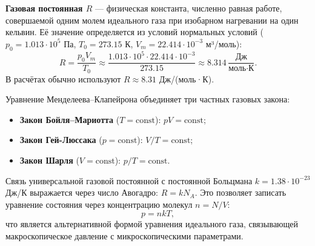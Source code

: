 \begin{property}
\textbf{Газовая постоянная $R$} --- физическая константа, численно равная работе, совершаемой одним молем идеального газа при изобарном нагревании на один кельвин.
Её значение определяется из условий нормальных условий ($p_0 = 1.013 \cdot 10^5$ Па, $T_0 = 273.15$ К, $V_m = 22.414 \cdot 10^{-3}$ м³/моль):
\begin{equation}
    R = \frac{p_0 V_m}{T_0} \approx \frac{1.013 \cdot 10^5 \cdot 22.414 \cdot 10^{-3}}{273.15} \approx 8.314 \, \frac{\text{Дж}}{\text{моль} \cdot \text{К}}. \label{eq:R_value_36}
\end{equation}
В расчётах обычно используют $R \approx 8.31$ Дж/(моль·К).
\end{property}

\begin{remark}
Уравнение Менделеева--Клапейрона объединяет три частных газовых закона:
\begin{itemize}
    \item \textbf{Закон Бойля--Мариотта} ($T=\text{const}$): $pV = \text{const}$;
    \item \textbf{Закон Гей-Люссака} ($p=\text{const}$): $V/T = \text{const}$;
    \item \textbf{Закон Шарля} ($V=\text{const}$): $p/T = \text{const}$.
\end{itemize}
Связь универсальной газовой постоянной с постоянной Больцмана $k = 1.38 \cdot 10^{-23}$ Дж/К выражается через число Авогадро: $R = k N_A$. Это позволяет записать уравнение состояния через концентрацию молекул $n = N/V$:
\begin{equation}
    p = n k T,
\end{equation}
что является альтернативной формой уравнения идеального газа, связывающей макроскопическое давление с микроскопическими параметрами.
\end{remark}
